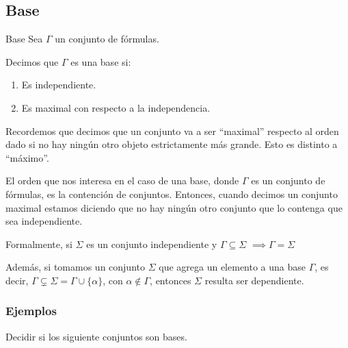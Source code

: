 \subsection{Base}

\begin{definicion}{Base}{}
    Sea $\Gamma$ un conjunto de fórmulas.

    \medskip

    Decimos que $\Gamma$ es una base si:
    \begin{enumerate}
        \item Es independiente.
        \item Es maximal con respecto a la independencia.
    \end{enumerate}
\end{definicion}


Recordemos que decimos que un conjunto va a ser ``maximal'' respecto al orden
dado si no hay ningún otro objeto estrictamente más grande. Esto es distinto
a ``máximo''.

El orden que nos interesa en el caso de una base, donde $\Gamma$ es un
conjunto de fórmulas, es la contención de conjuntos. Entonces, cuando decimos
un conjunto maximal estamos diciendo que no hay ningún otro conjunto que lo
contenga que sea independiente.


Formalmente, si $\Sigma$ es un conjunto independiente y 
$\Gamma \subseteq \Sigma$ $\implies \Gamma = \Sigma$

%
Además, si tomamos un conjunto $\Sigma$ que agrega un elemento a una base 
$\Gamma$, es decir, $\Gamma \varsubsetneq \Sigma = \Gamma \cup \{\alpha\}$, 
con $\alpha \notin \Gamma$, entonces $\Sigma$ resulta ser dependiente.

\subsubsection{Ejemplos}

Decidir si los siguiente conjuntos son bases.

